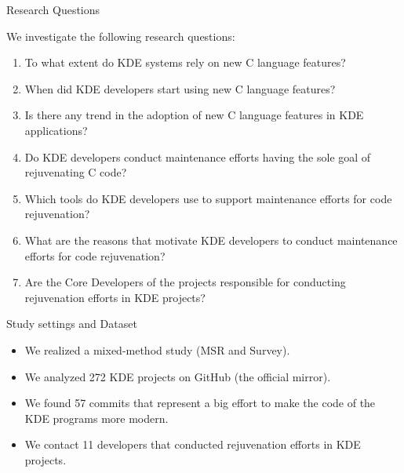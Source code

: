 \documentclass[newPxFont,numfooter,sectionpages]{beamer}
\newcommand{\Rplus}{\protect\hspace{-.1em}\protect\raisebox{.35ex}{\small\textbf{+}}}
\newcommand{\cc}{\mbox{C\Rplus\Rplus}\xspace}
\newcommand{\rqa}{To what extent do KDE systems rely on new \cc language features?}
\newcommand{\rqb}{When did KDE developers start using new \cc language features?}
\newcommand{\rqc}{Is there any trend in the adoption of new \cc language features in KDE applications?}
\newcommand{\rqd}{Do KDE developers conduct maintenance efforts having the sole goal of rejuvenating \cc code?}
\newcommand{\rqe}{Which tools do KDE developers use to support maintenance efforts for code rejuvenation?}
\newcommand{\rqf}{What are the reasons that motivate KDE developers to conduct maintenance efforts for code rejuvenation?}
\newcommand{\rqg}{Are the Core Developers of the projects responsible for conducting rejuvenation efforts in KDE projects?}
\begin{document}
\begingroup
{}
\begin{frame}[c]{Research Questions}

We investigate the following research questions:
{\footnotesize
\begin{enumerate}[(RQ1)]
  \item \rqa
  \item \rqb
  \item \rqc
  \item \rqd
  \item \rqe
  \item \rqf
  \item \rqg
\end{enumerate}
}




\end{frame}


\begin{frame}{Study settings and Dataset}

\begin{itemize}
    \item We realized a mixed-method study (MSR and Survey).
    \item We analyzed 272 KDE projects on GitHub (the official mirror).
    \item We found 57 commits that represent a big effort to make the code of the KDE programs more modern.
    \item We contact 11 developers that conducted rejuvenation efforts in KDE projects.
\end{itemize}

\end{frame}
\end{document}
